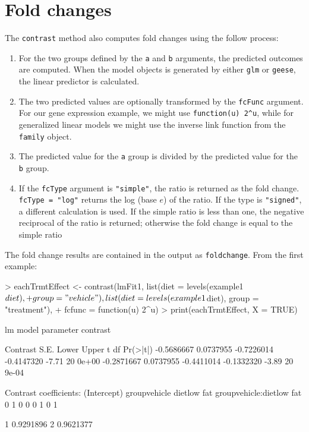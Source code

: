 \documentclass[12pt]{article}
\begin{document}
\section{Fold changes}

The \texttt{contrast} method also computes fold changes using the follow process:

\begin{enumerate}
\item For the two groups defined by the \texttt{a} and \texttt{b} arguments, the predicted outcomes are computed. When the model objects is generated by either \texttt{glm} or \texttt{geese}, the linear predictor is calculated.
\item The two predicted values are optionally transformed by the \texttt{fcFunc} argument. For our gene expression example, we might use \verb+function(u) 2^u+, while for generalized linear models we might use the inverse link function from the \texttt{family} object. 
\item The predicted value for the \texttt{a} group is divided by the predicted value for the \texttt{b} group.
\item If the \texttt{fcType} argument is \texttt{"simple"}, the ratio is returned as the fold change. \texttt{fcType = "log"} returns the log (base $e$) of the ratio. If the type is \texttt{"signed"}, a different calculation is used. If the simple ratio is less than one, the negative reciprocal of the ratio is returned; otherwise the fold change is equal to the simple ratio
\end{enumerate}

The fold change results are contained in the output as \texttt{foldchange}. From the first example:

{\small
\begin{Schunk}
\begin{Sinput}
> eachTrmtEffect <- contrast(lmFit1, list(diet = levels(example1$diet), 
+     group = "vehicle"), list(diet = levels(example1$diet), group = "treatment"), 
+     fcfunc = function(u) 2^u)
> print(eachTrmtEffect, X = TRUE)
\end{Sinput}
\begin{Soutput}
lm model parameter contrast

   Contrast      S.E.      Lower      Upper     t df Pr(>|t|)
 -0.5686667 0.0737955 -0.7226014 -0.4147320 -7.71 20    0e+00
 -0.2871667 0.0737955 -0.4411014 -0.1332320 -3.89 20    9e-04

Contrast coefficients:
 (Intercept) groupvehicle dietlow fat groupvehicle:dietlow fat
           0            1           0                        0
           0            1           0                        1
\end{Soutput}
\begin{Soutput}
       [,1]
1 0.9291896
2 0.9621377
\end{Soutput}
\end{Schunk}
}
\end{document}
